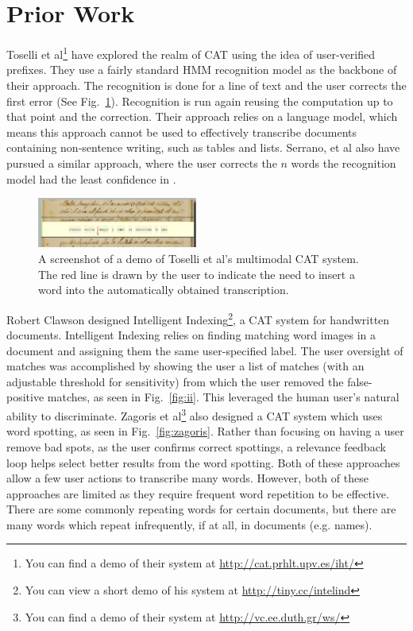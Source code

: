 \documentclass[conference]{IEEEtran}
\begin{document}
\section{Prior Work}
Toselli et al\cite{Toselli2010}\footnote{You can find a demo of their system at \url{http://cat.prhlt.upv.es/iht/}} have explored the realm of CAT using the idea of user-verified prefixes. They use a fairly standard HMM recognition model as the backbone of their approach. The recognition is done for a line of text and the user corrects the first error (See Fig.~\ref{fig:Toselli_multimodalCAT}). Recognition is run again reusing the computation up to that point and the correction. Their approach relies on a language model, which means this approach cannot be used to effectively transcribe documents containing non-sentence writing, such as tables and lists. Serrano, et al also have pursued a similar approach, where the user corrects the $n$ words the recognition model had the least confidence in \cite{Serrano2014}.

\begin{figure}
    \centering
    \includegraphics[width=0.47\textwidth]{Toselli_multimodalCAT}
    \caption{A screenshot of a demo of Toselli et al's multimodal CAT system. The red line is drawn by the user to indicate the need to insert a word into the automatically obtained transcription.}
    \label{fig:Toselli_multimodalCAT}
\end{figure}

Robert Clawson designed Intelligent Indexing\cite{Clawson2014}\footnote{You can view a short demo of his system at \url{http://tiny.cc/intelind}}, a CAT system for handwritten documents. Intelligent Indexing relies on finding matching word images in a document and assigning them the same user-specified label.
The user oversight of matches was accomplished by showing the user a list of matches (with an adjustable threshold for sensitivity) from which the user removed the false-positive matches, as seen in Fig.~\ref{fig:ii}. This leveraged the human user's natural ability to discriminate. Zagoris et al\cite{Zagoris2015}\footnote{You can find a demo of their system at \url{http://vc.ee.duth.gr/ws/}} also designed a CAT system which uses word spotting, as seen in Fig.~\ref{fig:zagoris}. Rather than focusing on having a user remove bad spots, as the user confirms correct spottings, a relevance feedback loop helps select better results from the word spotting. Both of these approaches allow a few user actions to transcribe many words. However, both of these approaches are limited as they require frequent word repetition to be effective. There are some commonly repeating words for certain documents, but there are many words which repeat infrequently, if at all, in documents (e.g. names).
\end{document}
